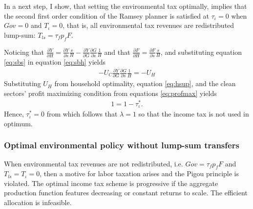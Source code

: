 In a next step, I show, that setting the environmental tax optimally, implies that the second first order condition of the Ramsey planner is satisfied at $\tau_\iota=0$ when $Gov=0$ and $T_\iota=0$, that is, all environmental tax revenues are redistributed lump-sum: $T_{ls}=\tau_{f}p_fF$.

Noticing that $\frac{\partial Y}{\partial H}= \frac{\partial Y}{\partial s}\frac{s}{H}-\frac{\partial Y}{\partial G}\frac{\partial G}{\partial s}\frac{1}{H}$ and that $\frac{\partial F}{\partial H}=\frac{\partial F}{\partial s}\frac{s}{H}$, and substituting equation \ref{eq:sbs} in equation \ref{eq:sbh} yields
\begin{align}
-U_C \frac{\partial Y}{\partial G}\frac{\partial G}{\partial s}\frac{1}{H}=-U_H
\end{align}
Substituting $U_H$ from household optimality, equation \ref{eq:hsup}, and the clean sectors' profit maximizing condition from equations \ref{eq:profmax} yields
\begin{align}
1=1-\tau^*_\iota.
\end{align}
Hence, $\tau^*_\iota =0$ from which follows that $\lambda =1$ so that the income tax is not used in optimum. 


\subsubsection{Optimal environmental policy without lump-sum transfers}
\begin{prop}\label{prop:2}
When environmental tax revenues are not redistributed, i.e. $Gov=\tau_fp_fF$ and $T_{ls}=T_\iota=0$, then a motive for labor taxation arises and the Pigou principle is violated. The optimal income tax scheme is progressive if the aggregate production function features decreasing or constant returns to scale. The efficient allocation is infeasible.  
\end{prop}
\begin{comment}
\begin{prop}\label{prop:1}
	Even if the Ramsey planner implements the efficient share of dirty production, %
	the optimal allocation is inefficient absent additional measures to reduce hours worked. Lump-sum transferring environmental tax revenues are one means to establish the efficient allocation. 
\end{prop}

content...
\end{comment}


